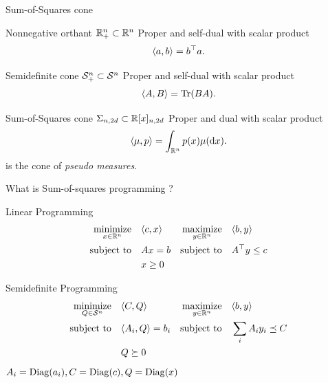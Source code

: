 \documentclass{beamer}
\begin{document}
  \begin{frame}{Sum-of-Squares cone}
    \begin{block}{Nonnegative orthant $\R^n_+ \subset \R^n$}
      Proper and self-dual with scalar product
      \[ \la a, b \ra = b^\Tr a. \]
    \end{block}
    \vspace{-1.5em}
    \begin{block}{Semidefinite cone $\Psd \subset \SymK$}
      Proper and self-dual with scalar product
      \[ \la A, B \ra = \trace(B A). \]
    \end{block}
    \vspace{-1.5em}
    \begin{block}{Sum-of-Squares cone $\Sos[n, 2d] \subset \R[x]_{n, 2d}$}
      Proper and dual %
      with scalar product
      \[ \la \mu, p \ra = \int_{\R^n} p(x) \mu(\dif x). \]
      is the cone of \emph{pseudo measures}.
    \end{block}
  \end{frame}
  \begin{frame}{What is Sum-of-squares programming ?}
    \begin{block}{Linear Programming}
      \vspace{-1em}
      \begin{align*}
        \mini_{x \in \R^n}\quad & \la c, x \ra & \maxi_{y \in \R^n} \quad & \la b, y \ra\\
        \subtoq & Ax = b & \subtoq & A^\Tr y \leq c\\
        & x \geq 0
      \end{align*}
    \end{block}
    \vspace{-2em}
    \begin{block}{Semidefinite Programming}
      \vspace{-1em}
      \begin{align*}
        \mini_{Q \in \SymK} \quad & \la C, Q \ra & \maxi_{y \in \R^n} \quad & \la b, y \ra\\
        \subtoq & \la A_i, Q \ra = b_i & \subtoq & \sum_i A_i y_i \preceq C\\
          & Q \succeq 0
      \end{align*}
      $A_i = \Diag(a_i), C = \Diag(c), Q = \Diag(x)$
    \end{block}
  \end{frame}
\end{document}
